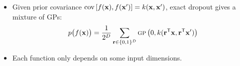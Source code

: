 {\begin{itemize}
	\item Given prior covariance $\operatorname{cov} \left[ f({\bf{x}}), f({\bf{x}}') \right] = k({\bf{x}}, {\bf{x}}')$,
	exact dropout gives a mixture of GPs:$$ p \big( f({\bf{x}}) \big)= \frac{1}{2^D} \sum_{{\bf{r}} \in \{0,1\}^D}  {\textsc{gp}} \left(0, k({\bf{r}}^\mathsf{T} {\bf{x}}, {\bf{r}}^\mathsf{T}{\bf{x}}') \right)$$
	\item Each function only depends on some input dimensions.
\end{itemize}
}


